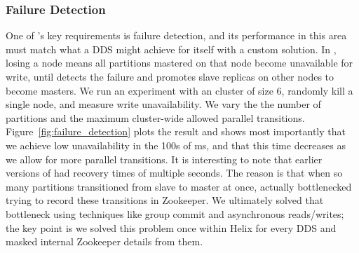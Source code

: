 \subsubsection{Failure Detection}
\label{sec:failuredetection}
%
One of \helix's key requirements is failure detection, and its performance in
this area must match what a DDS might achieve for itself with a custom solution.
In \ES, losing a node means all partitions mastered on that node become
unavailable for write, until \helix detects the failure and promotes slave
replicas on other nodes to become masters.
We run an experiment with an \ES cluster of size 6, randomly kill a single
node, and measure write unavailability.  We vary the the number
of \ES partitions and the maximum cluster-wide allowed parallel transitions.
Figure~\ref{fig:failure_detection} plots the result and shows most importantly
that we achieve low unavailability in the 100s of ms, and that this time decreases as we allow
for more parallel transitions.  It is interesting to note that earlier versions
of \helix had recovery times of multiple seconds.  The reason is that when so
many partitions transitioned from slave to master at once, \helix actually
bottlenecked trying to record these transitions in Zookeeper.  We ultimately
solved that bottleneck using techniques like group commit and asynchronous
reads/writes;  the key point is we solved this problem once within Helix for
every DDS and masked internal Zookeeper details from them.

